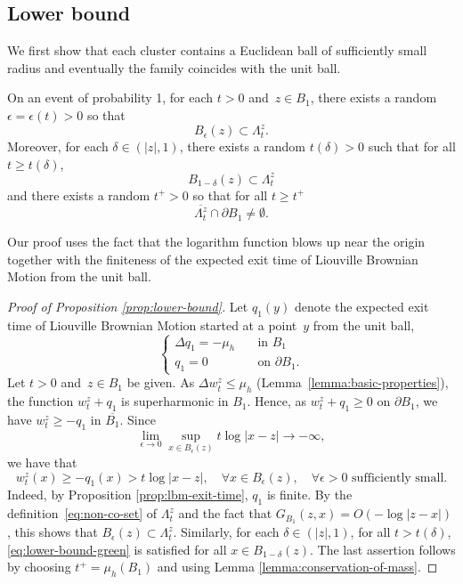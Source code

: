 \documentclass[12pt]{amsart}
\numberwithin{equation}{section}
\newcommand{\lss}[2]{\hyperref[eq:least-super-solution]{w^{#1}_{#2}}}
\newcommand{\cluster}[2]{\hyperref[eq:non-co-set]{\mathit{\Lambda}^{#1}_{#2}}}
\begin{document}
	
	\subsection{Lower bound}
	We first show that each cluster contains a Euclidean ball of sufficiently small radius and eventually the family 
	coincides with the unit ball. 
	\begin{prop} \label{prop:lower-bound}
		On an event of probability 1, for each $t > 0$ and~$z \in B_1$,  there exists a random $\epsilon = \epsilon(t) > 0$ so that 
		\begin{equation}
		B_{\epsilon}(z) \subset {\cluster{z}{t}}.
		\end{equation}
		Moreover, for each $\delta \in (|z|,1)$, there exists a random $t(\delta)>0$ such that for all $t \geq t(\delta)$,
		\begin{equation}
		B_{1-\delta}(z) \subset  {\cluster{z}{t}} 
		\end{equation}
		and there exists a random $t^+ > 0$ so that for all $t \geq t^+$
		\begin{equation}
		\overline{{{\cluster{z}{t}}}} \cap \partial B_1 \neq \emptyset.
		\end{equation}
	\end{prop}
	
	Our proof uses the fact that the logarithm function blows up near the origin together with 
	the finiteness of the expected exit time of Liouville Brownian Motion from the unit ball. 
	
	\begin{proof}[Proof of Proposition \ref{prop:lower-bound}]
		
		Let $q_1(y)$ denote the expected exit time of Liouville Brownian Motion started at a point~$y$ from the unit ball, 		
		\[
		\begin{cases}
		\Delta q_1 = -\mu_h \quad &\mbox{in $B_1$} \\
		q_1 = 0 \quad &\mbox{on $\partial B_1$}.
		\end{cases}
		\]
		Let $t > 0$ and~$z \in B_1$ be given. 
		As $\Delta \lss{z}{t} \leq \mu_h$ (Lemma~\ref{lemma:basic-properties}), the function $\lss{z}{t} + q_{1}$ is superharmonic in $B_1$. Hence, as $\lss{z}{t} + q_1 \geq 0$ on $\partial B_1$, we have $\lss{z}{t} \geq -q_{1} $ 
		in $\overline{B_1}$. Since
		\[
		\lim_{\epsilon \to 0} \sup_{x \in B_{\epsilon}(z)} t \log |x-z| \to -\infty,
		\]
		we have that
		\begin{equation} \label{eq:lower-bound-green}
		\lss{z}{t}(x) \geq  -q_{1}(x) > t \log |x-z|, \quad \forall x \in B_{\epsilon}(z), \quad \forall \epsilon > 0 \mbox{ sufficiently small}.
		\end{equation}
		Indeed, by Proposition \ref{prop:lbm-exit-time}, $q_{1}$ is finite. By the definition~\eqref{eq:non-co-set} of ${\cluster{z}{t}}$ and the fact that $G_{B_1}(z,x) = O(-\log|z-x|)$, this shows that $B_{\epsilon}(z) \subset {\cluster{z}{t}}$. 	Similarly, for each $\delta \in (|z|,1)$, for all $t > t(\delta)$, \eqref{eq:lower-bound-green}
		is satisfied for all $x \in B_{1-\delta}(z)$. 	The last assertion follows by choosing $t^+ = \mu_h(B_1)$
		and using Lemma \ref{lemma:conservation-of-mass}.
	\end{proof}
	
\end{document}
